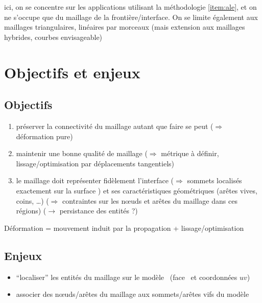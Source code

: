 ici, on se concentre sur les applications utilisant la méthodologie \ref{item:ale}, et on ne s'occupe que du maillage de la frontière/interface. On se limite également aux maillages triangulaires, linéaires par morceaux (mais extension aux maillages hybrides, courbes envisageable)

\section{Objectifs et enjeux}
\subsection{Objectifs}
\begin{enumerate}
	\item préserver la connectivité du maillage autant que faire se peut ($\Rightarrow$ déformation pure)
	\item maintenir une bonne qualité de maillage ($\Rightarrow$ métrique à définir, lissage/optimisation par déplacements tangentiels)
	\item le maillage doit représenter fidèlement l'interface ($\Rightarrow$ sommets localisés exactement sur la surface \brep) et ses caractéristiques géométriques (arêtes vives, coins, \ldots) ($\Rightarrow$ contraintes sur les n\oe uds et arêtes du maillage dans ces régions) ($\to$ persistance des entités \brep?)
\end{enumerate}

Déformation = mouvement induit par la propagation + lissage/optimisation

\subsection{Enjeux}
\begin{itemize}
	\item ``localiser'' les entités du maillage sur le modèle \brep\ (face \brep\ et coordonnées $uv$) 
	\item associer des n\oe uds/arêtes du maillage aux sommets/arêtes vifs du modèle \brep
\end{itemize}


